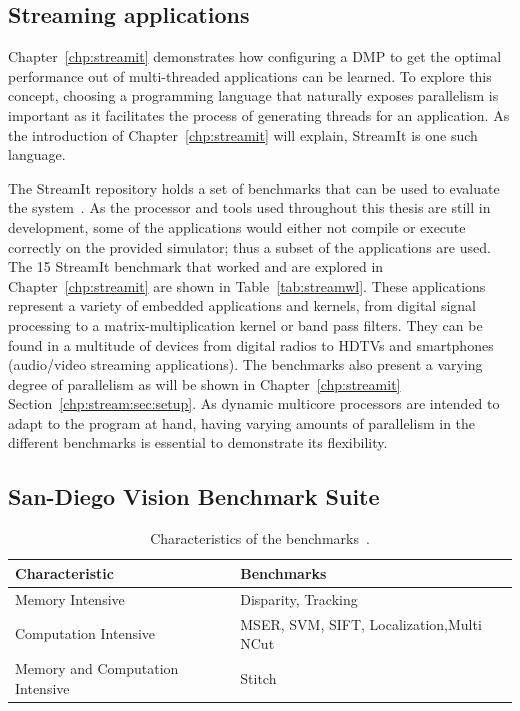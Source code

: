\subsection{Streaming applications}\label{chp:setup:streamit}

Chapter~\ref{chp:streamit} demonstrates how configuring a DMP to get the optimal performance out of multi-threaded applications can be learned.
To explore this concept, choosing a programming language that naturally exposes parallelism is important as it facilitates the process of generating threads for an application.
As the introduction of Chapter~\ref{chp:streamit} will explain, StreamIt is one such language.

The StreamIt repository holds a set of benchmarks that can be used to evaluate the system~\cite{streamitrepo}.
As the processor and tools used throughout this thesis are still in development, some of the applications would either not compile or execute correctly on the provided simulator; thus a subset of the applications are used.
The 15 StreamIt benchmark that worked and are explored in Chapter~\ref{chp:streamit} are shown in Table~\ref{tab:streamwl}.
These applications represent a variety of embedded applications and kernels, from digital signal processing to a matrix-multiplication kernel or band pass filters.
They can be found in a multitude of devices from digital radios to HDTVs and smartphones (audio/video streaming applications).
The benchmarks also present a varying degree of parallelism as will be shown in Chapter~\ref{chp:streamit} Section~\ref{chp:stream:sec:setup}.
As dynamic multicore processors are intended to adapt to the program at hand, having varying amounts of parallelism in the different benchmarks is essential to demonstrate its flexibility.

\subsection{San-Diego Vision Benchmark Suite}\label{chp:setup:sdvbs}
\begin{table}[t]
  \smaller
  \centering
 \begin{tabular} { | l | l | }
 \hline
   \cellcolor[gray]{0.7}Characteristic & \cellcolor[gray]{0.7} Benchmarks\\ \hline
    Memory Intensive & Disparity, Tracking\\ \hline
	Computation Intensive & MSER, SVM, SIFT, Localization,Multi NCut\\\hline
	Memory and Computation Intensive & Stitch\\ \hline
   \end{tabular}
  \caption{Characteristics of the benchmarks~\cite{sdvbs}.}\label{tab:sd-vbschar}
\vspace{1em}
  \end{table}
  
